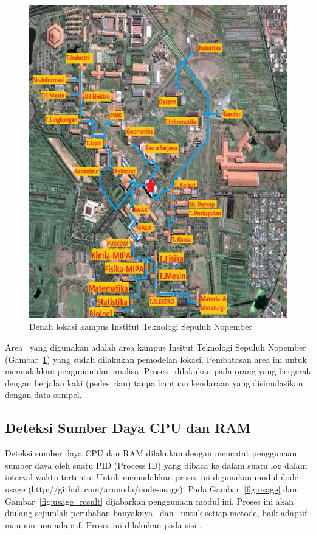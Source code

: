 \begin{figure}
  \centering
  \includegraphics[scale=0.4]
	{images/3-its.png}
  \caption{Denah lokasi kampus Institut Teknologi Sepuluh Nopember}
\label{fig:its}
\end{figure}

Area \tracking~yang digunakan adalah area kampus Insitut Teknologi Sepuluh
Nopember (Gambar~\ref{fig:its}) yang sudah dilakukan pemodelan lokasi.
Pembatasan area ini untuk memudahkan pengujian dan analisa. Proses
\tracking~dilakukan pada orang yang bergerak dengan berjalan kaki (pedestrian)
tanpa bantuan kendaraan yang disimulasikan dengan data sampel.

\subsection{Deteksi Sumber Daya CPU dan RAM}

Deteksi sumber daya CPU dan RAM dilakukan dengan mencatat penggunaan sumber daya
oleh suatu PID (\f{Process ID}) yang dibaca ke dalam suatu log dalam interval
waktu tertentu. Untuk memudahkan proses ini digunakan modul \f{node-usage}
(http://github.com/arunoda/node-usage). Pada Gambar~\ref{fig:usage} dan
Gambar~\ref{fig:usage_result} dijabarkan penggunaan modul ini. Proses ini akan
diulang sejumlah perubahan banyaknya \publisher~dan \subscriber~untuk setiap
metode, baik adaptif maupun non adaptif. Proses ini dilakukan pada sisi \server.

